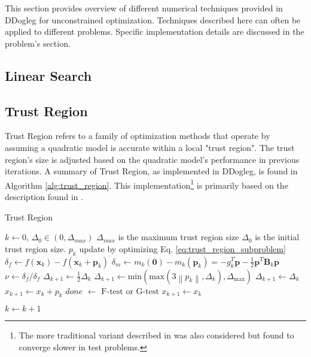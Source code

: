 \documentclass[peerreview,compsoc,onecolumn]{IEEEtran}
\newcommand{\norm}[1]{\left\lVert#1\right\rVert}
\begin{document}
This section provides overview of different numerical techniques provided in DDogleg for unconstrained optimization. Techniques described here can often be applied to different problems. Specific implementation details are discussed in the problem's section.
\subsection{Linear Search}

\subsection{Trust Region}
Trust Region refers to a family of optimization methods that operate by assuming a quadratic model is accurate within a local "trust region". The trust region's size is adjusted based on the quadratic model's performance in previous iterations. A summary of Trust Region, as implemented in DDogleg, is found in Algorithm \ref{alg:trust_region}. This implementation\footnote{The more traditional variant described in \cite{numopt2006,fletcher1987} was also considered but found to converge slower in test problems.} is primarily based on the description found in \cite{IMM2004}.

\begin{algorithm}{}
\caption{\label{alg:trust_region}Trust Region}
\begin{algorithmic}[1]
	\State $k \gets 0$, $\Delta_0 \in (0,\Delta_{max})$
	\State \quad $\Delta_{max}$ is the maximum trust region size
	\State \quad $\Delta_{0}$ is the initial trust region size. 
	\State $p_k$ update by optimizing Eq. \ref{eq:trust_region_subproblem} 
	\State $\delta_f \gets f(\bm{x}_k) - f(\bm{x}_k + \bm{p}_k)$ 
	\State $\delta_m \gets m_k(\bm{0})-m_k(\bm{p}_k) = -g^T_k \bm{p} - \frac{1}{2}\bm{p}^T \bm{B}_k \bm{p}$ 
	\State $\nu \gets \delta_f / \delta_f$  
	 
		\State $\Delta_{k+1} \gets \frac{1}{2}\Delta_k$
	\Else
			\State $\Delta_{k+1} \gets \mbox{min}(\mbox{max}(3\norm{p_k},\Delta_k),\Delta_{\mbox{max}})$
		\Else
			\State $\Delta_{k+1} \gets \Delta_k$
		\EndIf
	\EndIf
	 
		\State $x_{k+1} \gets x_k + p_k$ 
		\State $done$ $\gets$ $\mbox{F-test}$ or $\mbox{G-test}$ 
	\Else
		\State $x_{k+1} \gets x_k$
	\EndIf

	\State $k \gets k + 1$
	\EndWhile
\end{algorithmic}
\end{algorithm}
\end{document}
